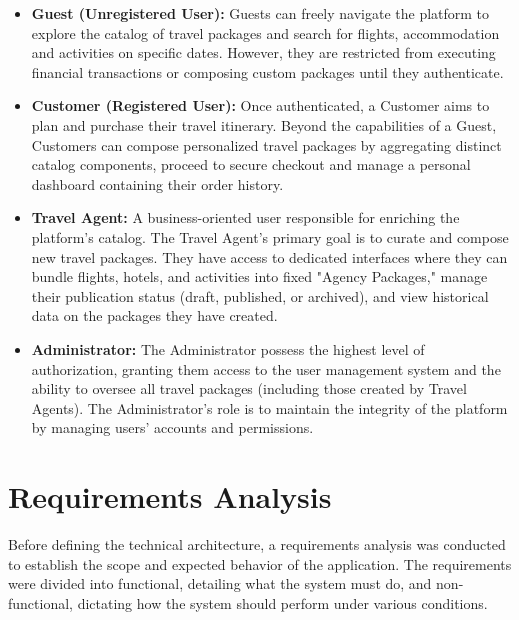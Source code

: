 \begin{itemize}
    \item \textbf{Guest (Unregistered User):} Guests can freely navigate the platform to explore the catalog of travel packages and search for flights, accommodation and activities on specific dates. However, they are restricted from executing financial transactions or composing custom packages until they authenticate.
    
    \item \textbf{Customer (Registered User):} Once authenticated, a Customer aims to plan and purchase their travel itinerary. Beyond the capabilities of a Guest, Customers can compose personalized travel packages by aggregating distinct catalog components, proceed to secure checkout and manage a personal dashboard containing their order history.
    
    \item \textbf{Travel Agent:} A business-oriented user responsible for enriching the platform's catalog. The Travel Agent's primary goal is to curate and compose new travel packages. They have access to dedicated interfaces where they can bundle flights, hotels, and activities into fixed "Agency Packages," manage their publication status (draft, published, or archived), and view historical data on the packages they have created.
    
    \item \textbf{Administrator:} The Administrator possess the highest level of authorization, granting them access to the user management system and the ability to oversee all travel packages (including those created by Travel Agents). The Administrator's role is to maintain the integrity of the platform by managing users' accounts and permissions.
\end{itemize}


\section{Requirements Analysis}
\label{sec:requirements_analysis}

Before defining the technical architecture, a requirements analysis was conducted to establish the scope and expected behavior of the application. The requirements were divided into functional, detailing what the system must do, and non-functional, dictating how the system should perform under various conditions.

